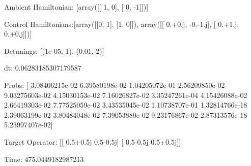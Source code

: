 \documentclass{article}
\begin{document}
    

\newpage

Ambient Hamiltonian: [array([[ 1,  0],
       [ 0, -1]])]

Control Hamiltonians:[array([[0, 1],
       [1, 0]]), array([[ 0.+0.j, -0.-1.j],
       [ 0.+1.j,  0.+0.j]])]

Detunings: [(1e-05, 1), (0.01, 2)]

 dt: 0.06283185307179587

Probs: [  3.08406215e-02   6.39580198e-02   1.04205072e-01   2.56209850e-02
   9.03275603e-02   4.15030153e-02   7.16026827e-02   3.35247261e-04
   4.15426088e-02   2.66419303e-02   7.77525059e-02   3.43535045e-02
   1.10738707e-01   1.32814766e-18   2.39063199e-02   3.80484048e-02
   7.39053880e-02   9.23176867e-02   2.87313576e-18   5.23997407e-02]

Target Operator: [[ 0.5+0.5j  0.5-0.5j]
 [ 0.5-0.5j  0.5+0.5j]]

Time: 475.0449182987213
\end{document}

